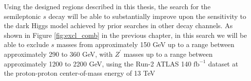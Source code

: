 Using the designed regions described in this thesis, the search for the semileptonic $s$ decay will be able to substantially improve upon the sensitivity to the dark Higgs model achieved by prior searches in other decay channels. As shown in Figure \ref{fig:excl_comb} in the previous chapter, in this search we will be able to exclude $s$ masses from approximately 150 GeV up to a range between approximately 290 to 360 GeV, with $Z^\prime$ masses up to a range between approximately 1200 to 2200 GeV, using the Run-2 ATLAS 140 $\text{fb}^{-1}$ dataset at the proton-proton center-of-mass energy of 13 TeV
